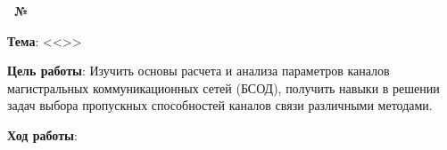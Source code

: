\begin{center}
    \textbf{\titlePageWorkType~№\titlePageWorkNumber~\titlePageWorkPart}
\end{center}

\textbf{Тема}: <<\titlePageTopic>>

\textbf{Цель работы}: 
Изучить основы расчета и анализа параметров каналов магистральных коммуникационных сетей (БСОД), получить навыки в решении задач выбора пропускных способностей каналов связи различными методами.

\begin{center}
    \textbf{Ход работы}:
\end{center}
